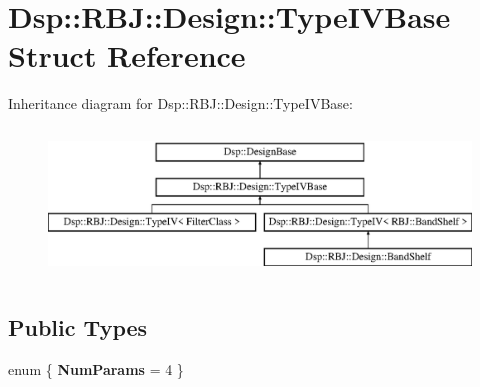 \hypertarget{structDsp_1_1RBJ_1_1Design_1_1TypeIVBase}{\section{Dsp\-:\-:R\-B\-J\-:\-:Design\-:\-:Type\-I\-V\-Base Struct Reference}
\label{structDsp_1_1RBJ_1_1Design_1_1TypeIVBase}
}
Inheritance diagram for Dsp\-:\-:R\-B\-J\-:\-:Design\-:\-:Type\-I\-V\-Base\-:\begin{figure}[H]
\begin{center}
\leavevmode
\includegraphics[height=4.000000cm]{structDsp_1_1RBJ_1_1Design_1_1TypeIVBase}
\end{center}
\end{figure}
\subsection*{Public Types}
\begin{DoxyCompactItemize}
\item 
enum \{ {\bfseries Num\-Params} =  4
 \}
\end{DoxyCompactItemize}
